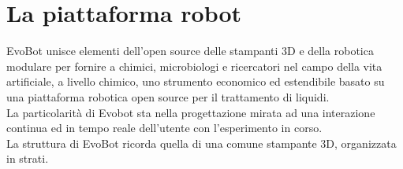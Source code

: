 \chapter{La piattaforma robot}
\vspace{0.5cm}

\label{cha:789}
EvoBot unisce elementi dell'open source delle stampanti 3D e della robotica modulare per fornire a chimici, microbiologi e ricercatori nel campo della vita artificiale, a livello chimico, uno strumento economico ed estendibile basato su una piattaforma robotica open source per il trattamento di liquidi.
\\ La particolarità di Evobot sta nella progettazione mirata ad una interazione continua ed in tempo reale dell'utente con l'esperimento in corso.\cite{introd-robot}
\\La struttura di EvoBot ricorda quella di una comune stampante 3D, organizzata in strati.



